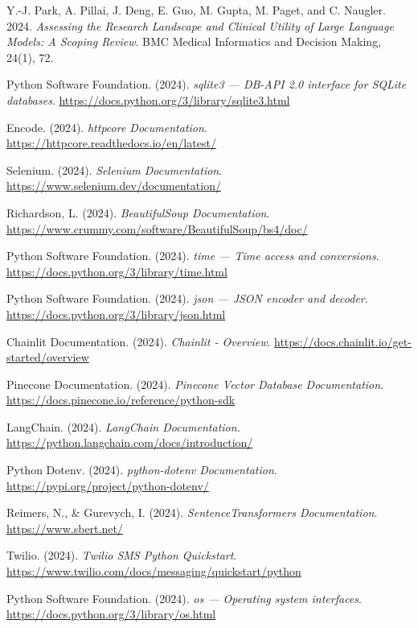 \begin{thebibliography}{55}
Y.-J. Park, A. Pillai, J. Deng, E. Guo, M. Gupta, M. Paget, and C. Naugler. 2024. \emph{Assessing the Research Landscape and Clinical Utility of Large Language Models: A Scoping Review}. BMC Medical Informatics and Decision Making, 24(1), 72.

Python Software Foundation. (2024). \emph{sqlite3 — DB-API 2.0 interface for SQLite databases}. \url{https://docs.python.org/3/library/sqlite3.html}

Encode. (2024). \emph{httpcore Documentation}. \url{https://httpcore.readthedocs.io/en/latest/}

Selenium. (2024). \emph{Selenium Documentation}. \url{https://www.selenium.dev/documentation/}

Richardson, L. (2024). \emph{BeautifulSoup Documentation}. \url{https://www.crummy.com/software/BeautifulSoup/bs4/doc/}

Python Software Foundation. (2024). \emph{time — Time access and conversions}. \url{https://docs.python.org/3/library/time.html}

Python Software Foundation. (2024). \emph{json — JSON encoder and decoder}. \url{https://docs.python.org/3/library/json.html}

Chainlit Documentation. (2024). \emph{Chainlit - Overview}. \url{https://docs.chainlit.io/get-started/overview}

Pinecone Documentation. (2024). \emph{Pinecone Vector Database Documentation}. \url{https://docs.pinecone.io/reference/python-sdk}

LangChain. (2024). \emph{LangChain Documentation}. \url{https://python.langchain.com/docs/introduction/}

Python Dotenv. (2024). \emph{python-dotenv Documentation}. \url{https://pypi.org/project/python-dotenv/}

Reimers, N., \& Gurevych, I. (2024). \emph{SentenceTransformers Documentation}. \url{https://www.sbert.net/}

Twilio. (2024). \emph{Twilio SMS Python Quickstart}. \url{https://www.twilio.com/docs/messaging/quickstart/python}

Python Software Foundation. (2024). \emph{os — Operating system interfaces}. \url{https://docs.python.org/3/library/os.html}


\end{thebibliography}

